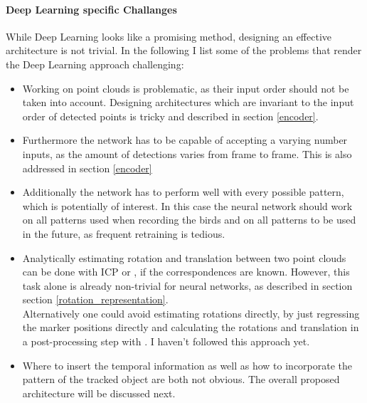 \documentclass[12pt,a4paper]{article}
\begin{document}
\paragraph{Deep Learning specific Challanges} While Deep Learning looks like a promising method, designing an effective architecture is not trivial. In the following I list some of the problems that render the Deep Learning approach challenging:
\begin{itemize}
	\item Working on point clouds is problematic, as their input order should not be taken into account. Designing architectures which are invariant to the input order of detected points is tricky and described in section \ref{encoder}.
	\item Furthermore the network has to be capable of accepting a varying number inputs, as the amount of detections varies from frame to frame. This is also addressed in section \ref{encoder}
	\item Additionally the network has to perform well with every possible pattern, which is potentially of interest. In this case the neural network should work on all patterns used when recording the birds and on all patterns to be used in the future, as frequent retraining is tedious.
	\item Analytically estimating rotation and translation between two point clouds can be done with ICP or \cite{umeyama}, if the correspondences are known. However, this task alone is already non-trivial for neural networks, as described in section section \ref{rotation_representation}.\\
	Alternatively one could avoid estimating rotations directly, by just regressing the marker positions directly and calculating the rotations and translation in a post-processing step with \cite{umeyama}. I haven't followed this approach yet.
	\item Where to insert the temporal information as well as how to incorporate the pattern of the tracked object are both not obvious. The overall proposed architecture will be discussed next.

\end{itemize}
\end{document}
